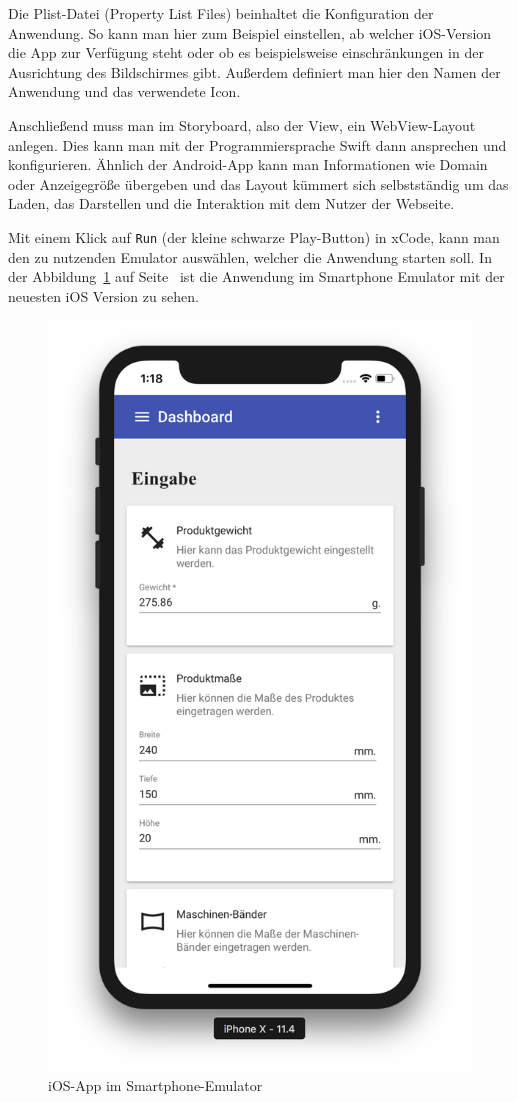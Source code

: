 Die Plist-Datei (Property List Files) beinhaltet die Konfiguration der Anwendung. So kann man hier zum Beispiel
einstellen, ab welcher iOS-Version die App zur Verfügung steht oder ob es beispielsweise einschränkungen in der
Ausrichtung des Bildschirmes gibt. Außerdem definiert man hier den Namen der Anwendung und das verwendete Icon.

Anschließend muss man im Storyboard, also der View, ein WebView-Layout anlegen. Dies kann man mit der Programmiersprache
Swift dann ansprechen und konfigurieren. Ähnlich der Android-App kann man Informationen wie Domain oder Anzeigegröße
übergeben und das Layout kümmert sich selbstständig um das Laden, das Darstellen und die Interaktion mit dem Nutzer der
Webseite.

Mit einem Klick auf \texttt{Run} (der kleine schwarze Play-Button) in xCode, kann man den zu nutzenden Emulator
auswählen, welcher die Anwendung starten soll. In der Abbildung~\ref{fig:umsetzung_ios_app} auf
Seite~\pageref{fig:umsetzung_ios_app} ist die Anwendung im Smartphone Emulator mit der neuesten iOS Version zu sehen.

\begin{figure}[h]
    \centering
    \includegraphics[scale=0.35]{images/kapitel_4/ios_app.png}
    \caption{iOS-App im Smartphone-Emulator}
    \label{fig:umsetzung_ios_app}
\end{figure}
